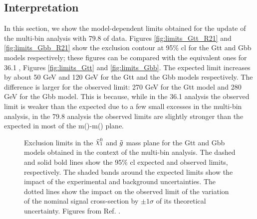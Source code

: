 \FloatBarrier

\subsection{Interpretation}

In this section, we show the model-dependent limits obtained for the update of the multi-bin analysis with 79.8 \ifb of data. 
Figures \ref{fig:limits_Gtt_R21} and \ref{fig:limits_Gbb_R21} show the exclusion contour at 95\% \gls{cl} for the Gtt and Gbb 
models respectively; these figures can be compared with the equivalent ones for 36.1 \ifb, Figures \ref{fig:limits_Gtt} and 
\ref{fig:limits_Gbb}. 
The expected limit increases by about 50 GeV and 120 GeV for the Gtt and the Gbb models respectively. 
The difference is larger for the observed limit: 270 GeV for the Gtt model and 280 GeV for the Gbb model. 
This is because, while in the 36.1 \ifb analysis the observed limit is weaker than the expected due to 
a few small excesses in the multi-bin analysis, in the 79.8 \ifb 
analysis the observed limits are slightly stronger than the expected in most of the 
m(\gluino)-m(\ninoone) plane. 



\begin{figure}[htbp]
	\centering 
	\caption{Exclusion limits in the $\ninoone$ and $\tilde{g}$ mass plane
  		for the  Gtt and   Gbb models obtained
		in the context of the multi-bin analysis. The dashed and solid bold lines
		show the 95\% \gls{cl} expected and observed limits, respectively. The
  		shaded bands around the expected limits show the
                impact of the
  		experimental and background uncertainties. The dotted
  		lines show the impact on the observed limit of the variation of the
  		nominal signal cross-section by $\pm 1 \sigma$ of its theoretical
  		uncertainty. 
  		Figures from Ref. \cite{ATLAS-CONF-2018-041}.	
      }
	\label{fig:limits_GbbGtt_R21}
\end{figure}

